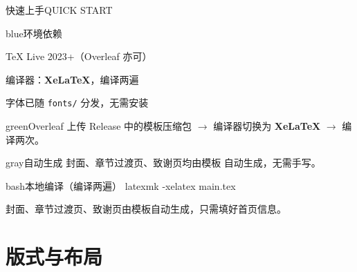 \documentclass[10pt,aspectratio=169]{beamer}
\begin{document}
\begin{frame}[fragile]{快速上手}{QUICK START}
  \begin{minipage}[t]{0.475\textwidth}
    \vspace{0pt}%
    \begin{zjubox}{blue}{环境依赖}
      {\footnotesize
      \begin{denseitem}
        \item TeX Live 2023+（Overleaf 亦可）
        \item 编译器：\textbf{XeLaTeX}，编译两遍
        \item 字体已随 \texttt{fonts/} 分发，无需安装
      \end{denseitem}}
    \end{zjubox}
  \end{minipage}\hfill
  \begin{minipage}[t]{0.475\textwidth}
    \vspace{0pt}%
    \begin{zjubox}{green}{Overleaf}
      {\footnotesize 上传 Release 中的模板压缩包
      $\rightarrow$ 编译器切换为 \textbf{XeLaTeX}
      $\rightarrow$ 编译两次。}
    \end{zjubox}
    \begin{zjubox}{gray}{自动生成}
      {\footnotesize 封面、章节过渡页、致谢页均由模板
      自动生成，无需手写。}
    \end{zjubox}
  \end{minipage}
  \vspace{0.8mm}
  \begin{zjucode}{bash}{本地编译（编译两遍）}
latexmk -xelatex main.tex
  \end{zjucode}
  \begin{takeaway}
    封面、章节过渡页、致谢页由模板自动生成，只需填好首页信息。
  \end{takeaway}
\end{frame}

\section{版式与布局}
\end{document}
